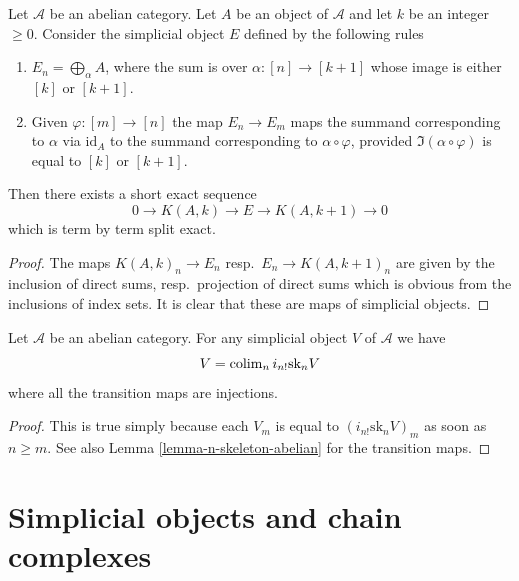 \begin{lemma}
\label{lemma-extension}
Let $\mathcal{A}$ be an abelian category.
Let $A$ be an object of $\mathcal{A}$ and
let $k$ be an integer $\geq 0$. Consider the
simplicial object $E$ defined by the following rules
\begin{enumerate}
\item $E_n = \bigoplus_\alpha A$, where the
sum is over $\alpha : [n] \to [k + 1]$ whose
image is either $[k]$ or $[k + 1]$.
\item Given $\varphi : [m] \to [n]$ the map
$E_n \to E_m$ maps the summand corresponding
to $\alpha$ via $\text{id}_A$ to the summand
corresponding to $\alpha \circ \varphi$,
provided $\Im(\alpha \circ \varphi)$
is equal to $[k]$ or $[k + 1]$.
\end{enumerate}
Then there exists a short exact sequence
$$
0 \to K(A, k) \to E \to K(A, k + 1) \to 0
$$
which is term by term split exact.
\end{lemma}

\begin{proof}
The maps $K(A, k)_n \to E_n$ resp.\ $E_n \to K(A, k + 1)_n$
are given by the inclusion of direct sums, resp.\ projection
of direct sums which is obvious from the inclusions of index
sets. It is clear that these are maps of simplicial
objects.
\end{proof}

\begin{lemma}
\label{lemma-abelian-limit-skeleta}
Let $\mathcal{A}$ be an abelian category.
For any simplicial object $V$ of $\mathcal{A}$ we have
$$
V = \mathop{\mathrm{colim}}\nolimits_n i_{n!}\text{sk}_n V
$$
where all the transition maps are injections.
\end{lemma}

\begin{proof}
This is true simply because each $V_m$ is
equal to $(i_{n!}\text{sk}_n V)_m$ as
soon as $n \geq m$. See also Lemma \ref{lemma-n-skeleton-abelian}
for the transition maps.
\end{proof}

\section{Simplicial objects and chain complexes}
\label{section-complexes}

